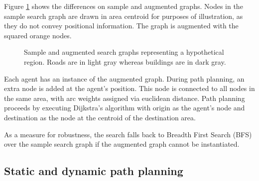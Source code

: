 Figure \ref{fig:graphs} shows the differences on sample and augmented graphs. Nodes in the sample search graph are drawn in area centroid for purposes of illustration, as they do not convey positional information. The graph is augmented with the squared orange nodes.

\begin{figure}[ht]
  \centering
  \caption{Sample  and augmented  search graphs representing a hypothetical region. Roads are in light gray whereas buildings are in dark gray.}
  \label{fig:graphs}
\end{figure}

Each agent has an instance of the augmented graph. During path planning, an extra node is added at the agent's position. This node is connected to all nodes in the same area, with arc weights assigned via euclidean distance. Path planning proceeds by executing Dijkstra's algorithm with origin as the agent's node and destination as the node at the centroid of the destination area. 

As a measure for robustness, the search falls back to Breadth First Search (BFS) over the sample search graph if the augmented graph cannot be instantiated. 

\subsection{Static and dynamic path planning}
\label{sec:static-dynamic}

